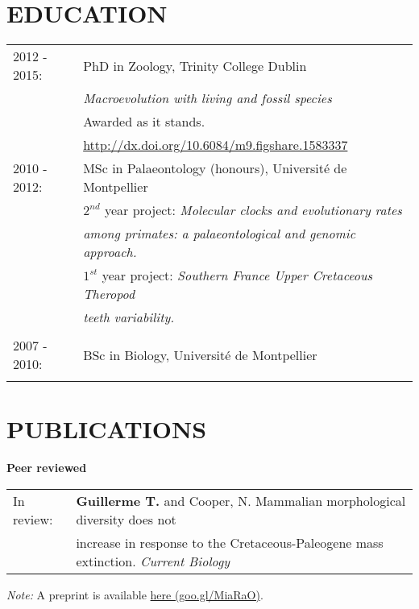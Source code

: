 \documentclass[10pt,a4paper]{article}
\begin{document}
{%
\section{EDUCATION}
\raggedright
\begin{tabular}{ll} 
2012 - 2015: & PhD in Zoology, Trinity College Dublin\\
& \textit{Macroevolution with living and fossil species} \\
& Awarded as it stands. \\
& \href{http://figshare.com/articles/Macroevolution_with_living_and_fossil_species/1583337}{http://dx.doi.org/10.6084/m9.figshare.1583337} \\
2010 - 2012: & MSc in Palaeontology (honours), Universit\'{e} de Montpellier\\
& $2^{nd}$ year project: \textit{Molecular clocks and evolutionary rates}\\
& \textit{among primates: a palaeontological and genomic approach.} \\
& $1^{st}$ year project: \textit{Southern France Upper Cretaceous Theropod}\\
& \textit{teeth variability.} \\
& \\
2007 - 2010: & BSc in Biology, Universit\'{e} de Montpellier\\
& \\
\end{tabular}

\section{PUBLICATIONS}
\raggedright\textbf{Peer reviewed}\\[1.5ex]
\begin{tabular}{ll}
In review: & \textbf{Guillerme T.} and Cooper, N. Mammalian morphological diversity does not\\
& increase in response to the Cretaceous-Paleogene mass extinction. \textit{Current Biology}\\
\end{tabular}
\textit{Note:} A preprint is available \href{https://goo.gl/MiaRaO}{here (goo.gl/MiaRaO)}. \\ 

}
\end{document}
